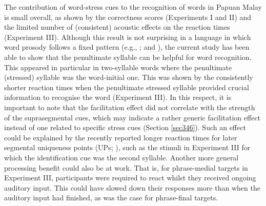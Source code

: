 The contribution of word-stress cues to the recognition of words in Papuan Malay is small overall, as shown by the correctness scores (Experiments I and II) and the limited number of (consistent) acoustic effects on the reaction times (Experiment III). Although this result is not surprising in a language in which word prosody follows a fixed pattern (e.g., \citealt{dogil_phonetic_1999}; and \citealt{peperkamp_perception_2010}), the current study has been able to show that the penultimate syllable can be helpful for word recognition. This appeared in particular in two-syllable words where the penultimate (stressed) syllable was the word-initial one. This was shown by the consistently shorter reaction times when the penultimate stressed syllable provided crucial information to recognise the word (Experiment III). In this respect, it is important to note that the facilitation effect did not correlate with the strength of the suprasegmental cues, which may indicate a rather generic facilitation effect instead of one related to specific stress cues (Section \ref{sec346}). Such an effect could be explained by the recently reported longer reaction times for later segmental uniqueness points (UPs; \citealt{tucker_massive_2019}), such as the stimuli in Experiment III for which the identification cue was the second syllable. Another more general processing benefit could also be at work. That is, for phrase-medial targets in Experiment III, participants were required to react whilst they received ongoing auditory input. This could have slowed down their responses more than when the auditory input had finished, as was the case for phrase-final targets.

